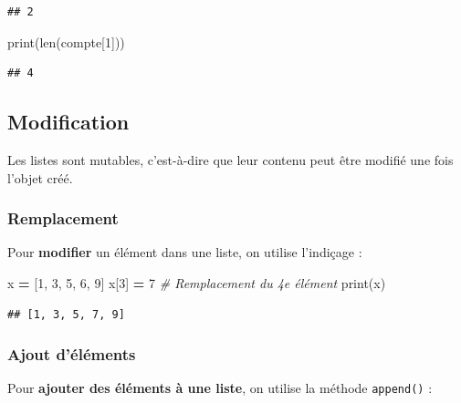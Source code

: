 \documentclass[12pt,]{book}
\newenvironment{Shaded}{\begin{snugshade}}{\end{snugshade}}
\newcommand{\DecValTok}[1]{\textcolor[rgb]{0.00,0.00,0.81}{#1}}
\newcommand{\CommentTok}[1]{\textcolor[rgb]{0.56,0.35,0.01}{\textit{#1}}}
\newcommand{\OperatorTok}[1]{\textcolor[rgb]{0.81,0.36,0.00}{\textbf{#1}}}
\newcommand{\BuiltInTok}[1]{#1}
\newcommand{\NormalTok}[1]{#1}
\numberwithin{equation}{section}
\numberwithin{countremarque}{section}
\begin{document}
\begin{lstlisting}
## 2
\end{lstlisting}

\begin{Shaded}
\begin{Highlighting}[]
\BuiltInTok{print}\NormalTok{(}\BuiltInTok{len}\NormalTok{(compte[}\DecValTok{1}\NormalTok{]))}
\end{Highlighting}
\end{Shaded}

\begin{lstlisting}
## 4
\end{lstlisting}

\subsection{Modification}\label{modification}

Les listes sont mutables, c'est-à-dire que leur contenu peut être
modifié une fois l'objet créé.

\subsubsection{Remplacement}\label{remplacement}

Pour \textbf{modifier} un élément dans une liste, on utilise l'indiçage
:

\begin{Shaded}
\begin{Highlighting}[]
\NormalTok{x }\OperatorTok{=}\NormalTok{ [}\DecValTok{1}\NormalTok{, }\DecValTok{3}\NormalTok{, }\DecValTok{5}\NormalTok{, }\DecValTok{6}\NormalTok{, }\DecValTok{9}\NormalTok{]}
\NormalTok{x[}\DecValTok{3}\NormalTok{] }\OperatorTok{=} \DecValTok{7} \CommentTok{# Remplacement du 4e élément}
\BuiltInTok{print}\NormalTok{(x)}
\end{Highlighting}
\end{Shaded}

\begin{lstlisting}
## [1, 3, 5, 7, 9]
\end{lstlisting}

\subsubsection{Ajout d'éléments}\label{ajout-delements}

Pour \textbf{ajouter des éléments à une liste}, on utilise la méthode
\texttt{append()} :
\end{document}

